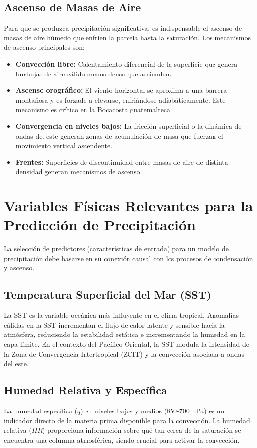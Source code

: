\subsection{Ascenso de Masas de Aire}
Para que se produzca precipitación significativa, es indispensable el ascenso de masas de aire húmedo que enfríen la parcela hasta la saturación. Los mecanismos de ascenso principales son:
\begin{itemize}
    \item \textbf{Convección libre:} Calentamiento diferencial de la superficie que genera burbujas de aire cálido menos denso que ascienden.
    \item \textbf{Ascenso orográfico:} El viento horizontal se aproxima a una barrera montañosa y es forzado a elevarse, enfriándose adiabáticamente. Este mecanismo es crítico en la Bocacosta guatemalteca.
    \item \textbf{Convergencia en niveles bajos:} La fricción superficial o la dinámica de ondas del este generan zonas de acumulación de masa que fuerzan el movimiento vertical ascendente.
    \item \textbf{Frentes:} Superficies de discontinuidad entre masas de aire de distinta densidad generan mecanismos de ascenso.
\end{itemize}

\section{Variables Físicas Relevantes para la Predicción de Precipitación}

La selección de predictores (características de entrada) para un modelo de precipitación debe basarse en su conexión causal con los procesos de condensación y ascenso.

\subsection{Temperatura Superficial del Mar (SST)}
La SST es la variable oceánica más influyente en el clima tropical. Anomalías cálidas en la SST incrementan el flujo de calor latente y sensible hacia la atmósfera, reduciendo la estabilidad estática e incrementando la humedad en la capa límite. En el contexto del Pacífico Oriental, la SST modula la intensidad de la Zona de Convergencia Intertropical (ZCIT) y la convección asociada a ondas del este.

\subsection{Humedad Relativa y Específica}
La humedad específica (\(q\)) en niveles bajos y medios (850-700 hPa) es un indicador directo de la materia prima disponible para la convección. La humedad relativa (\(HR\)) proporciona información sobre qué tan cerca de la saturación se encuentra una columna atmosférica, siendo crucial para activar la convección. 

